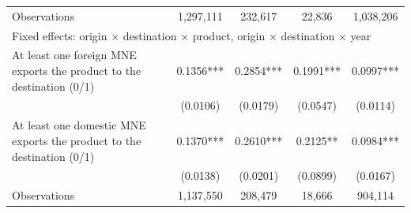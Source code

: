 \begin{tabular}{lcccc}
\quad Observations & 1,297,111 & 232,617 & 22,836 & 1,038,206 \\
\multicolumn{5}{l}{\footnotesize Fixed effects: origin $\times$ destination $\times$ product, origin $\times$ destination $\times$ year} \\
\quad At least one foreign MNE exports the product to the destination (0/1) & 0.1356*** & 0.2854*** & 0.1991*** & 0.0997*** \\
 & (0.0106) & (0.0179) & (0.0547) & (0.0114) \\
\quad At least one domestic MNE exports the product to the destination (0/1) & 0.1370*** & 0.2610*** & 0.2125** & 0.0984*** \\
 & (0.0138) & (0.0201) & (0.0899) & (0.0167) \\
\quad Observations & 1,137,550 & 208,479 & 18,666 & 904,114 \\
\hline
\end{tabular}
